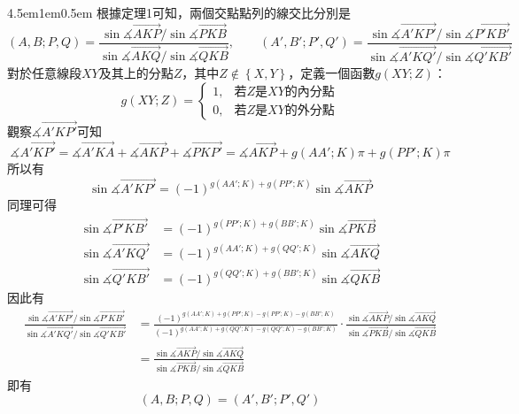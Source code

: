 \documentclass[12pt]{article}
\begin{document}
\begin{mybox}{4.5em}{1em}{0.5em}
    根據定理1可知，兩個交點點列的線交比分別是
    \begin{equation*}
        \left(A,B;P,Q\right)=\frac{\sin{\measuredangle{\overrightarrow{AKP}}}/\sin{\measuredangle{\overrightarrow{PKB}}}}
        {\sin{\measuredangle{\overrightarrow{AKQ}}}/\sin{\measuredangle{\overrightarrow{QKB}}}},\hspace{2em}
        \left(A',B';P',Q'\right)=\frac{\sin{\measuredangle{\overrightarrow{A'KP'}}}/\sin{\measuredangle{\overrightarrow{P'KB'}}}}
        {\sin{\measuredangle{\overrightarrow{A'KQ'}}}/\sin{\measuredangle{\overrightarrow{Q'KB'}}}}
    \end{equation*}
    對於任意線段$XY$及其上的分點$Z$，其中$Z\notin\left\{X,Y\right\}$，定義一個函數$g\left(XY;Z\right)$：
    $$
        g\left(XY;Z\right)=\begin{cases}
            1,&\text{若$Z$是$XY$的內分點}\\
            0,&\text{若$Z$是$XY$的外分點}
        \end{cases}
    $$
    觀察$\measuredangle{\overrightarrow{A'KP'}}$可知
    $$
        \measuredangle{\overrightarrow{A'KP'}}=
        \measuredangle{\overrightarrow{A'KA}}+\measuredangle{\overrightarrow{AKP}}+\measuredangle{\overrightarrow{PKP'}}
        =\measuredangle{\overrightarrow{AKP}}+g\left(AA';K\right)\pi+g\left(PP';K\right)\pi
    $$
    所以有
    $$
        \sin{\measuredangle{\overrightarrow{A'KP'}}}=(-1)^{g\left(AA';K\right)+g\left(PP';K\right)}\sin{\measuredangle{\overrightarrow{AKP}}}
    $$
    同理可得
    \begin{align*}
        \sin{\measuredangle{\overrightarrow{P'KB'}}}&=(-1)^{g\left(PP';K\right)+g\left(BB';K\right)}\sin{\measuredangle{\overrightarrow{PKB}}}\\
        \sin{\measuredangle{\overrightarrow{A'KQ'}}}&=(-1)^{g\left(AA';K\right)+g\left(QQ';K\right)}\sin{\measuredangle{\overrightarrow{AKQ}}}\\
        \sin{\measuredangle{\overrightarrow{Q'KB'}}}&=(-1)^{g\left(QQ';K\right)+g\left(BB';K\right)}\sin{\measuredangle{\overrightarrow{QKB}}}
    \end{align*}
    因此有
    \begin{align*}
        \frac{\sin{\measuredangle{\overrightarrow{A'KP'}}}/\sin{\measuredangle{\overrightarrow{P'KB'}}}}
        {\sin{\measuredangle{\overrightarrow{A'KQ'}}}/\sin{\measuredangle{\overrightarrow{Q'KB'}}}}
        &=\frac{(-1)^{g\left(AA';K\right)+g\left(PP';K\right)-g\left(PP';K\right)-g\left(BB';K\right)}}{(-1)^{g\left(AA';K\right)+g\left(QQ';K\right)-g\left(QQ';K\right)-g\left(BB';K\right)}}
        \cdot\frac{\sin{\measuredangle{\overrightarrow{AKP}}}/\sin{\measuredangle{\overrightarrow{AKQ}}}}{\sin{\measuredangle{\overrightarrow{PKB}}}/\sin{\measuredangle{\overrightarrow{QKB}}}}\\
        &=\frac{\sin{\measuredangle{\overrightarrow{AKP}}}/\sin{\measuredangle{\overrightarrow{AKQ}}}}{\sin{\measuredangle{\overrightarrow{PKB}}}/\sin{\measuredangle{\overrightarrow{QKB}}}}
    \end{align*}
    即有
    $$
        \left(A,B;P,Q\right)=\left(A',B';P',Q'\right)
    $$
\end{mybox}
\end{document}
